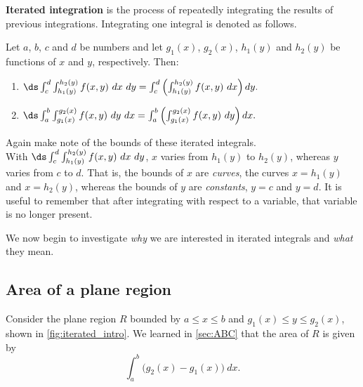 \begin{definition}\label{def:iterated_integral}
\textbf{Iterated integration} is the process of repeatedly integrating the results of previous integrations. Integrating one integral is denoted as follows.\bigskip

Let $a$, $b$, $c$ and $d$ be numbers and let $g_1(x)$, $g_2(x)$, $h_1(y)$ and $h_2(y)$ be functions of $x$ and $y$, respectively. Then:
\begin{enumerate}
	\item $\ds \int_c^d\int_{h_1(y)}^{h_2(y)} f(x,y)\ dx\ dy = \int_c^d\left(\int_{h_1(y)}^{h_2(y)} f(x,y)\ dx\right) dy.$
	\item $\ds \int_a^b\int_{g_1(x)}^{g_2(x)} f(x,y)\ dy\ dx = \int_a^b\left(\int_{g_1(x)}^{g_2(x)} f(x,y)\ dy\right) dx.$
\end{enumerate}
\end{definition}

Again make note of the bounds of these iterated integrals.\\
With $\ds \int_c^d\int_{h_1(y)}^{h_2(y)} f(x,y)\ dx\ dy$, $x$ varies from $h_1(y)$ to $h_2(y)$, whereas $y$ varies from $c$ to $d$. That is, the bounds of $x$ are \emph{curves}, the curves $x=h_1(y)$ and $x=h_2(y)$, whereas the bounds of $y$ are \emph{constants}, $y=c$ and $y=d$. It is useful to remember that
after integrating with respect to a variable, that variable is no longer present.

We now begin to investigate \emph{why} we are interested in iterated integrals and \emph{what} they mean.

\subsection{Area of a plane region}

Consider the plane region $R$ bounded by $a\leq x\leq b$ and $g_1(x)\leq y\leq g_2(x)$, shown in \autoref{fig:iterated_intro}. We learned in \autoref{sec:ABC} that the area of $R$ is given by 
\[\int_a^b \bigl(g_2(x)-g_1(x)\bigr)\ dx.\]

